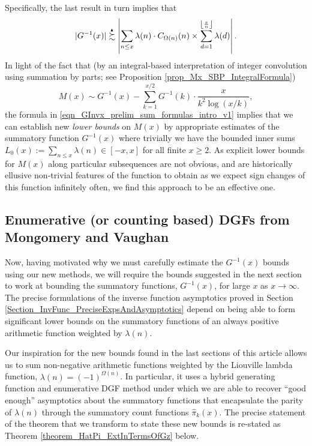 \documentclass[11pt,reqno,a4letter]{article}
\numberwithin{figure}{section}
\numberwithin{table}{section}
\newcommand{\Floor}[2]{\ensuremath{\left\lfloor \frac{#1}{#2} \right\rfloor}}
\theoremstyle{plain}
\numberwithin{theorem}{section}
\theoremstyle{definition}
\newcommand{\SuccSim}[0]{\overset{_{\scriptsize{\blacktriangle}}}{\succsim}}
\begin{document}
Specifically, the last result in turn implies that 
\begin{equation} 
\label{eqn_GInvx_prelim_sum_formulas_intro_v1} 
|G^{-1}(x)| \SuccSim \left\lvert 
     \sum_{n \leq x} \lambda(n) \cdot C_{\Omega(n)}(n) \times 
     \sum_{d=1}^{\Floor{x}{n}} \lambda(d) \right\rvert. 
\end{equation} 
In light of the fact that 
(by an integral-based interpretation of integer convolution using summation by parts; see 
Proposition \ref{prop_Mx_SBP_IntegralFormula}) 
\[
M(x) \sim G^{-1}(x) - \sum_{k=1}^{x/2} G^{-1}(k) \cdot \frac{x}{k^2 \log(x/k)}, 
\]
the formula in \eqref{eqn_GInvx_prelim_sum_formulas_intro_v1} implies that we can establish 
new \emph{lower bounds} on $M(x)$ by appropriate estimates of the summatory function 
$G^{-1}(x)$ where trivially we have the bounded inner sums 
$L_0(x) := \sum_{n \leq x} \lambda(n) \in [-x, x]$ for all finite $x \geq 2$. 
As explicit lower bounds for $M(x)$ along particular subsequences are not obvious, and are 
historically ellusive non-trivial features of the function to obtain as 
we expect sign changes of this function infinitely often, we find this approach to be an effective one. 

\subsection{Enumerative (or counting based) DGFs from Mongomery and Vaughan} 

Now, having motivated why we must carefully estimate the $G^{-1}(x)$ bounds using our new 
methods, we will require the bounds suggested in the next section to work at bounding the 
summatory functions, $G^{-1}(x)$, for large $x$ as $x \rightarrow \infty$. 
The precise formulations of the inverse function asymptotics 
proved in Section \ref{Section_InvFunc_PreciseExpsAndAsymptotics} depend on being able to form 
significant lower bounds on the summatory functions of an always positive arithmetic function 
weighted by $\lambda(n)$. 

Our inspiration for the new bounds found in the last sections of this article allows us to sum 
non-negative arithmetic functions weighted by the Liouville lambda function, 
$\lambda(n) = (-1)^{\Omega(n)}$. In particular, it uses a hybrid generating function and 
enumerative DGF method 
under which we are able to recover ``good enough'' asymptotics about the summatory functions that 
encapsulate the parity of $\lambda(n)$ through the summatory count functions $\widehat{\pi}_k(x)$. 
The precise statement of the theorem that we transform to state these new bounds is re-stated as 
Theorem \ref{theorem_HatPi_ExtInTermsOfGz} below. 
\end{document}
